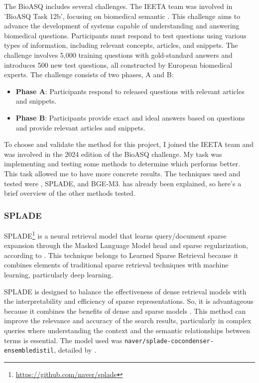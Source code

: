 The BioASQ includes several challenges. The IEETA team was involved in 'BioASQ Task 12b', focusing on biomedical semantic {\qa}. This challenge aims to advance the development of systems capable of understanding and answering biomedical questions. Participants must respond to test questions using various types of information, including relevant concepts, articles, and snippets. The challenge involves 5,000 training questions with gold-standard answers and introduces 500 new test questions, all constructed by European biomedical experts. The challenge consists of two phases, A and B:

\begin{itemize}
    \item \textbf{Phase A}: Participants respond to released questions with relevant articles and snippets.
    \item \textbf{Phase B}: Participants provide exact and ideal answers based on questions and provide relevant articles and snippets.
\end{itemize}

To choose and validate the {\ir} method for this project, I joined the IEETA team and was involved in the 2024 edition of the BioASQ challenge. My task was implementing and testing some {\ir} methods to determine which performs better. This task allowed me to have more concrete results. The techniques used and tested were {\bm}, SPLADE\cite{formal_splade_2021}, and BGE-M3\cite{chen_bge_2024}. {\bm} has already been explained, so here's a brief overview of the other methods tested.


\subsubsection{SPLADE} 

SPLADE\footnote{\url{https://github.com/naver/splade}} is a neural retrieval model that learns query/document sparse expansion through the {\bert} Masked Language Model head and sparse regularization, according to \citet{formal_splade_2021} . This technique belongs to Learned Sparse Retrieval because it combines elements of traditional sparse retrieval techniques with machine learning, particularly deep learning. 

SPLADE is designed to balance the effectiveness of dense retrieval models with the interpretability and efficiency of sparse representations. So, it is advantageous  because it combines the benefits of dense and sparse models \cite{formal_splade_2021}. This method can improve the relevance and accuracy of the search results, particularly in complex queries where understanding the context and the semantic relationships between terms is essential. The model used was \texttt{naver/splade-cocondenser-ensembledistil}, detailed by \citet{formal_distillation_2022}.

